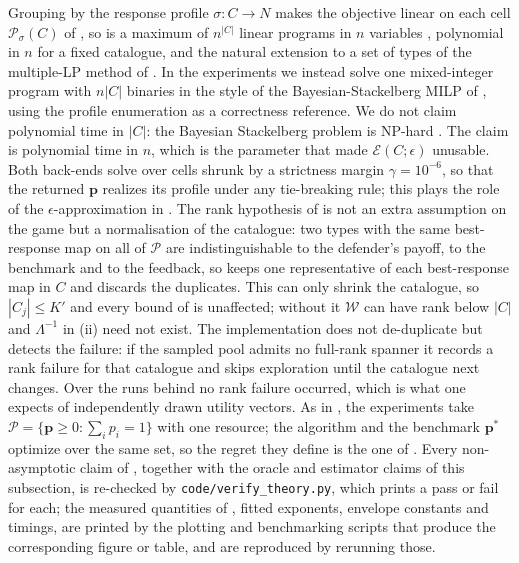 \documentclass[letterpaper,9pt,twocolumn]{extarticle}
\newcommand{\pvec}{\mathbf{p}}
\newcommand{\cP}{\mathcal{P}}
\newcommand{\cE}{\mathcal{E}}
\theoremstyle{plain}
\theoremstyle{definition}
\theoremstyle{remark}
\begin{document}
Grouping  by the response profile $\sigma:C\to N$ makes the
objective linear on each cell $\cP_\sigma(C)$ of , so
 is a maximum of $n^{|C|}$ linear programs in $n$ variables
, polynomial in $n$ for a fixed catalogue, and the natural extension to a
set of types of the multiple-LP method of \citet{conitzer2006}. In the experiments we instead solve one
mixed-integer program with $n|C|$ binaries in the style of the
Bayesian-Stackelberg MILP of \citet{paruchuri2008}, using the profile
enumeration as a correctness reference. We do not claim polynomial time in
$|C|$: the Bayesian Stackelberg problem is NP-hard \citep{conitzer2006}. The
claim is polynomial time in $n$, which is the parameter that made
$\cE(C;\epsilon)$ unusable. Both back-ends solve over cells shrunk by a
strictness margin $\gamma=10^{-6}$, so that the returned $\pvec$ realizes its
profile under any tie-breaking rule; this plays the role of the
$\epsilon$-approximation in . The rank hypothesis of
 is not an extra assumption on the game but a normalisation of
the catalogue: two types with the same best-response map on all of $\cP$ are
indistinguishable to the defender's payoff, to the benchmark
 and to the feedback, so  keeps one
representative of each best-response map in $C$ and discards the duplicates.
This can only shrink the catalogue, so $|C_j|\le K'$ and every bound of
 is unaffected; without it $\mathcal{W}$ can have rank below
$|C|$ and $\Lambda^{-1}$ in (ii) need not exist. The
implementation does not de-duplicate but detects the failure: if the sampled
pool admits no full-rank spanner it records a rank failure for that catalogue
and skips exploration until the catalogue next changes. Over the runs behind
 no rank failure occurred, which is what one expects of
independently drawn utility vectors. As in , the
experiments take $\cP=\{\pvec\ge 0:\sum_i p_i=1\}$ with one resource; the
algorithm and the benchmark $\pvec^{*}$ optimize over the same set, so the
regret they define is the one of . Every non-asymptotic claim of , together with the
oracle and estimator claims of this subsection, is re-checked by
\texttt{code/verify\_theory.py}, which prints a pass or fail for each; the
measured quantities of 
, fitted exponents, envelope constants and timings, are printed by the
plotting and benchmarking scripts that produce the corresponding figure or
table, and are reproduced by rerunning those.
\end{document}

